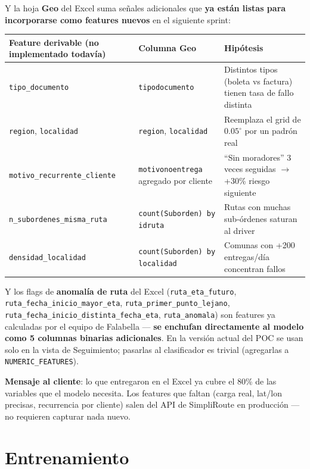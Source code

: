 \documentclass[11pt,a4paper]{article}
\newenvironment{quoteblock}{%
  \begin{shaded}\noindent\ignorespaces}{%
  \end{shaded}}
\begin{document}
Y la hoja \textbf{Geo} del Excel suma señales adicionales que \textbf{ya están listas para incorporarse como features nuevos} en el siguiente sprint:

\begin{longtable}{p{4.5cm} p{4.5cm} p{5.6cm}}
\toprule
\textbf{Feature derivable (no implementado todavía)} & \textbf{Columna Geo} & \textbf{Hipótesis} \\
\midrule
\endhead
\texttt{tipo\_documento} & \texttt{tipodocumento} & Distintos tipos (boleta vs factura) tienen tasa de fallo distinta \\
\texttt{region}, \texttt{localidad} & \texttt{region}, \texttt{localidad} & Reemplaza el grid de $0.05^{\circ}$ por un padrón real \\
\texttt{motivo\_recurrente\_cliente} & \texttt{motivonoentrega} agregado por cliente & ``Sin moradores'' 3 veces seguidas $\rightarrow$ +30\% riesgo siguiente \\
\texttt{n\_subordenes\_misma\_ruta} & \texttt{count(Suborden) by idruta} & Rutas con muchas sub-órdenes saturan al driver \\
\texttt{densidad\_localidad} & \texttt{count(Suborden) by localidad} & Comunas con +200 entregas/día concentran fallos \\
\bottomrule
\end{longtable}

Y los flags de \textbf{anomalía de ruta} del Excel (\texttt{ruta\_eta\_futuro}, \texttt{ruta\_fecha\_inicio\_mayor\_eta}, \texttt{ruta\_primer\_punto\_lejano}, \texttt{ruta\_fecha\_inicio\_distinta\_fecha\_eta}, \texttt{ruta\_anomala}) son features ya calculadas por el equipo de Falabella --- \textbf{se enchufan directamente al modelo como 5 columnas binarias adicionales}. En la versión actual del POC se usan solo en la vista de Seguimiento; pasarlas al clasificador es trivial (agregarlas a \texttt{NUMERIC\_FEATURES}).

\begin{quoteblock}
\textbf{Mensaje al cliente}: lo que entregaron en el Excel ya cubre el 80\% de las variables que el modelo necesita. Los features que faltan (carga real, lat/lon precisas, recurrencia por cliente) salen del API de SimpliRoute en producción --- no requieren capturar nada nuevo.
\end{quoteblock}

\section{Entrenamiento}
\end{document}
